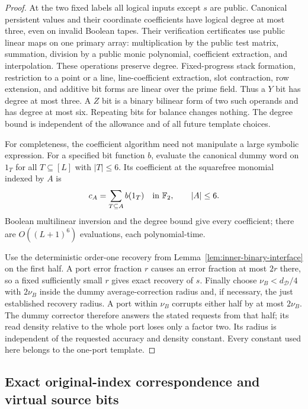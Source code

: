 \begin{proof}
At the two fixed labels all logical inputs except $s$ are public.
Canonical persistent values and their coordinate coefficients have
logical degree at most three, even on invalid Boolean tapes. Their
verification certificates use public linear maps on one primary array:
multiplication by the public test matrix, summation, division by a public
monic polynomial, coefficient extraction, and interpolation. These
operations preserve degree. Fixed-progress stack formation, restriction
to a point or a line, line-coefficient extraction, slot contraction, row
extension, and additive bit forms are linear over the prime field. Thus a
$Y$ bit has degree at most three. A $Z$ bit is a binary bilinear form of
two such operands and has degree at most six. Repeating bits for balance
changes nothing. The degree bound is independent of the allowance and
of all future template choices.

For completeness, the coefficient algorithm need not manipulate a
large symbolic expression. For a specified bit function $b$, evaluate
the canonical dummy word on $1_T$ for all $T\subseteq[L]$ with
$|T|\le6$. Its coefficient at the squarefree monomial indexed by $A$ is
\[
 c_A=\sum_{T\subseteq A}b(1_T)\quad\text{in }\mathbb{F}_2,
 \qquad |A|\le6.
\]
Boolean multilinear inversion and the degree bound give every
coefficient; there are $O((L+1)^6)$ evaluations, each polynomial-time.

Use the deterministic order-one recovery from
Lemma~\ref{lem:inner-binary-interface} on the first half. A port error
fraction $r$ causes an error fraction at most $2r$ there, so a fixed
sufficiently small $r$ gives exact recovery of $s$. Finally choose
$\nu_B<d_{\mathcal D}/4$ with $2\nu_B$ inside the dummy average-correction
radius and, if necessary, the just established recovery radius.
A port within $\nu_B$ corrupts either half by at most $2\nu_B$.
The dummy corrector therefore answers the stated requests from that
half; its read density relative to the whole port loses only a factor
two. Its radius is independent of the requested accuracy and density
constant. Every constant used here belongs to the one-port template.
\end{proof}

\subsection{Exact original-index correspondence and virtual source bits}

